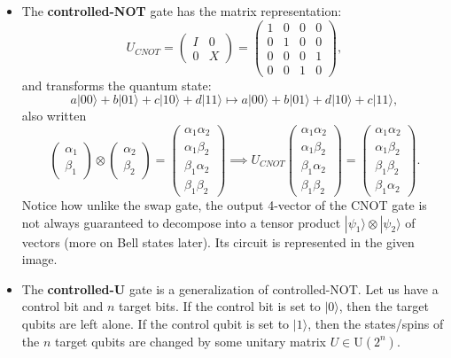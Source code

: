 \documentclass{article}
\theoremstyle{definition}
\begin{document}
\begin{itemize}
  \item The \textbf{controlled-NOT} gate has the matrix representation:
    \[U_{CNOT} = \begin{pmatrix} I & 0 \\ 0 & X \end{pmatrix} = \begin{pmatrix} 1&0&0&0\\0&1&0&0\\0&0&0&1\\0&0&1&0 \end{pmatrix},\]
    and transforms the quantum state:
    \[a |00\rangle + b |01\rangle + c|10\rangle + d|11\rangle \mapsto a |00\rangle + b |01\rangle + d|10\rangle + c|11\rangle,\]
    also written
    \[\begin{pmatrix} \alpha_1 \\ \beta_1 \end{pmatrix} \otimes \begin{pmatrix} \alpha_2 \\ \beta_2 \end{pmatrix} = \begin{pmatrix} \alpha_1 \alpha_2 \\ \alpha_1 \beta_2 \\ \beta_1 \alpha_2 \\ \beta_1 \beta_2 \end{pmatrix} \implies U_{CNOT} \begin{pmatrix} \alpha_1 \alpha_2 \\ \alpha_1 \beta_2 \\ \beta_1 \alpha_2 \\ \beta_1 \beta_2 \end{pmatrix} = \begin{pmatrix} \alpha_1 \alpha_2 \\ \alpha_1 \beta_2 \\ \beta_1 \beta_2 \\ \beta_1 \alpha_2 \end{pmatrix}.\]
    Notice how unlike the swap gate, the output 4-vector of the CNOT gate is not always guaranteed to decompose into a tensor product $|\psi_1 \rangle \otimes |\psi_2 \rangle$ of vectors (more on Bell states later). Its circuit is represented in the given image.
  \item The \textbf{controlled-U} gate is a generalization of controlled-NOT. Let us have a control bit and $n$ target bits. If the control bit is set to $|0 \rangle$, then the target qubits are left alone. If the control qubit is set to $|1\rangle$, then the states/spins of the $n$ target qubits are changed by some unitary matrix $U \in \text{U}(2^n)$.

\end{itemize}
\end{document}
